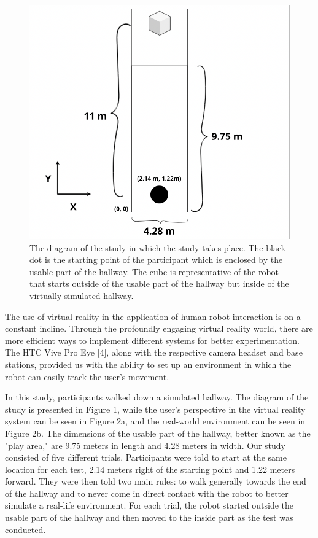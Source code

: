 \documentclass[letterpaper, 10 pt, conference]{ieeeconf}
\begin{document}
\begin{figure}
\centering
\includegraphics[scale=0.5]{Hallway.png}
\caption{The diagram of the study in which the study takes place. The black dot is the starting point of the participant which is enclosed by the usable part of the hallway. The cube is representative of the robot that starts outside of the usable part of the hallway but inside of the virtually simulated hallway.}
\end{figure}


   The use of virtual reality in the application of human-robot interaction is on a constant incline. Through the profoundly engaging virtual reality world, there are more efficient ways to implement different systems for better experimentation. The HTC Vive Pro Eye [4], along with the respective camera headset and base stations, provided us with the ability to set up an environment in which the robot can easily track the user's movement.
   
    In this study, participants walked down a simulated hallway. The diagram of the study is presented in Figure 1, while the user's perspective in the virtual reality system can be seen in Figure 2a, and the real-world environment can be seen in Figure 2b. The dimensions of the usable part of the hallway, better known as the "play area," are 9.75 meters in length and 4.28 meters in width. Our study consisted of five different trials. Participants were told to start at the same location for each test, 2.14 meters right of the starting point and 1.22 meters forward. They were then told two main rules: to walk generally towards the end of the hallway and to never come in direct contact with the robot to better simulate a real-life environment.
    For each trial, the robot started outside the usable part of the hallway and then moved to the inside part as the test was conducted.
    
\end{document}

